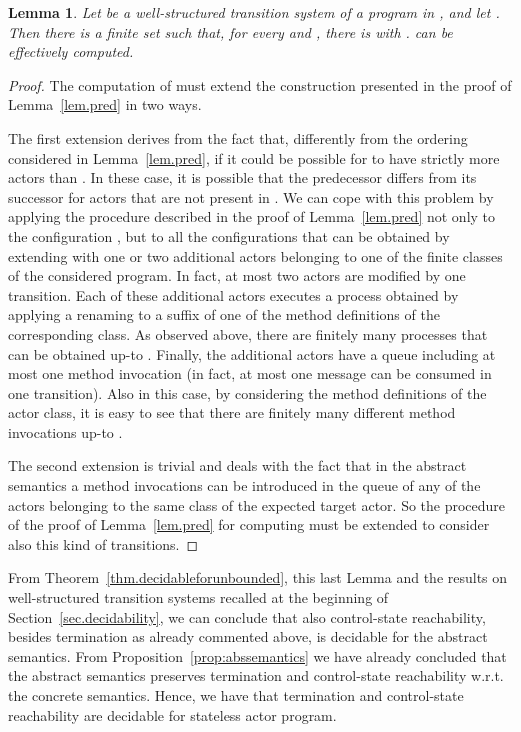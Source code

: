 \documentclass{LMCS}
\theoremstyle{plain}\newtheorem{proposition}[thm]{Proposition}
\theoremstyle{plain}\newtheorem{lemma}[thm]{Lemma}
\theoremstyle{plain}\newtheorem{theorem}[thm]{Theorem}
\theoremstyle{plain}\newtheorem{corollary}[thm]{Corollary}
\newif\ifconf \conffalse
\newcommand{\actsl}{}
\begin{document}
\begin{lemma}
\label{lem.predunbounded}
Let  be a 
well-structured transition system 
of a program in {\actsl}, and let . Then there is a finite set 
such that, for every  and 
, there is 
with .  can be effectively computed.
\end{lemma}

\ifconf
\else

\begin{proof}
The computation of  must extend the 
construction presented in the proof of Lemma~\ref{lem.pred}
in two ways.

The first extension derives from the fact that, 
differently from the ordering  considered 
in Lemma~\ref{lem.pred}, if  
it could be possible for  to have strictly
more actors than .
In these case, it is possible that the predecessor
differs from its successor  for actors
that are not present in .
We can cope with this problem
by applying the procedure described in the proof
of Lemma~\ref{lem.pred} not only to the configuration
, but to all the configurations that can be obtained
by extending  with
one or two additional actors belonging to one of the
finite classes of the considered program. 
In fact, at most two actors are modified by one transition.
Each of these additional actors executes a process obtained
by applying a renaming  to a suffix of 
one of the method definitions
of the corresponding class. As observed
above, there are finitely many processes that can 
be obtained up-to .
Finally, the additional actors
have a queue including at most one
method invocation (in fact, at most one message
can be consumed in one transition). Also in this
case, by considering the 
method definitions of the actor class,
it is easy to see that there are finitely
many different method invocations up-to .

The second extension is trivial and deals with the fact
that in the abstract semantics a method invocations can 
be introduced in the queue of any of the actors
belonging to the same class of the expected target actor.
So the procedure of the proof of Lemma~\ref{lem.pred} for computing
 must be extended to consider also this kind
of transitions.
\end{proof}
\fi

\ifconf
It turns out that 
control-state reachability
is decidable for the
abstract transition system of {\actsl}.
\else
From Theorem~\ref{thm.decidableforunbounded}, this last Lemma 
and the results on well-structured transition
systems recalled at the beginning of Section~\ref{sec.decidability},
we can conclude that also control-state reachability,
besides termination as already commented above,
is decidable for the abstract semantics. From Proposition~\ref{prop:abssemantics}
we have already concluded that the abstract semantics preserves
termination and control-state reachability w.r.t. the concrete 
semantics. Hence, we have that termination and 
control-state reachability are decidable for
stateless actor program. 
\fi
\end{document}

